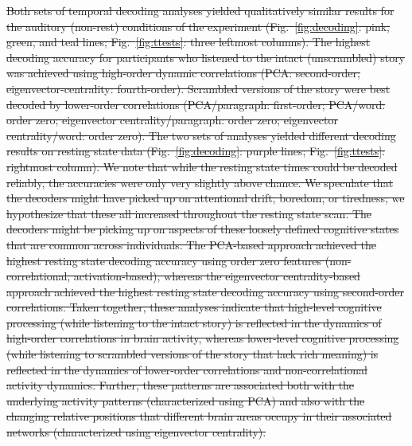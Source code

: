 \documentclass[english]{article}
\providecommand{\DIFdeltex}[1]{{\protect\color{red}\sout{#1}}}                      %
\providecommand{\DIFdel}[1]{\texorpdfstring{\DIFdeltex{#1}}{}} %
\begin{document}
\DIFdel{Both sets of temporal decoding analyses yielded qualitatively similar
results for the auditory (non-rest) conditions of the experiment
(Fig.~\ref{fig:decoding}: pink, green, and teal lines;
Fig.~\ref{fig:ttests}: three leftmost columns).  The highest
decoding accuracy for participants who listened to the intact
(unscrambled) story was achieved using high-order dynamic correlations
(PCA: second-order; eigenvector-centrality: fourth-order).  Scrambled
versions of the story were best decoded by lower-order correlations
(PCA/paragraph: first-order; PCA/word: order zero; eigenvector
centrality/paragraph: order zero; eigenvector centrality/word: order
zero).  The two sets of analyses yielded different decoding results on
resting state data (Fig.~\ref{fig:decoding}: purple lines;
Fig.~\ref{fig:ttests}: rightmost column).  We note
that while the resting state times could be decoded reliably, the
accuracies were only very slightly above chance.  We speculate that
the decoders might have picked up on attentional drift, boredom, or
tiredness; we hypothesize that these all increased throughout the resting
state scan.  The decoders might be picking up on aspects of these
loosely defined cognitive states that are common across individuals.
The PCA-based approach achieved the highest resting state decoding
accuracy using order zero features (non-correlational,
activation-based), whereas the eigenvector centrality-based approach
achieved the highest resting state decoding accuracy using
second-order correlations.  Taken together, these analyses indicate
that high-level cognitive processing (while listening to the intact
story) is reflected in the dynamics of high-order correlations in
brain activity, whereas lower-level cognitive processing (while
listening to scrambled versions of the story that lack rich meaning)
is reflected in the dynamics of lower-order correlations and
non-correlational activity dynamics.  Further, these patterns are
associated both with the underlying activity patterns (characterized
using PCA) and also with the changing relative positions that
different brain areas occupy in their associated networks
(characterized using eigenvector centrality).
}%
\end{document}
